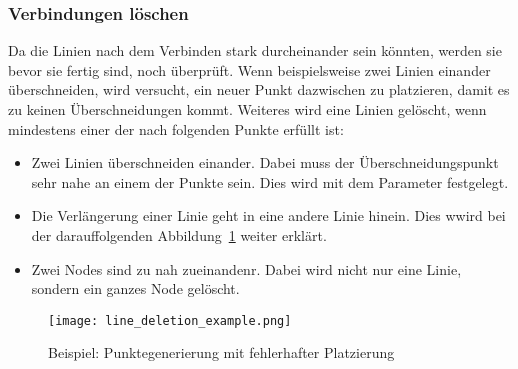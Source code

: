 \subsubsection{Verbindungen löschen}\label{subsubsec:verbindungen-loeschen}
Da die Linien nach dem Verbinden stark durcheinander sein könnten, werden sie bevor sie fertig sind, noch überprüft.
Wenn beispielsweise zwei Linien einander überschneiden, wird versucht, ein neuer Punkt dazwischen zu platzieren, damit es zu keinen Überschneidungen kommt.
Weiteres wird eine Linien gelöscht, wenn mindestens einer der nach folgenden Punkte erfüllt ist:
\begin{itemize}
    \item Zwei Linien überschneiden einander.
    Dabei muss der Überschneidungspunkt sehr nahe an einem der Punkte sein.
    Dies wird mit dem Parameter  festgelegt.
    \item Die Verlängerung einer Linie geht in eine andere Linie hinein.
    Dies wwird bei der darauffolgenden Abbildung~\ref{fig:line-deletion} weiter erklärt.
    \item Zwei Nodes sind zu nah zueinandenr.
    Dabei wird nicht nur eine Linie, sondern ein ganzes Node gelöscht.
\end{itemize}


\begin{figure}[H]
    \centering
    \texttt{[image: line\_deletion\_example.png]}
    \caption{Beispiel: Punktegenerierung mit fehlerhafter Platzierung}\label{fig:line-deletion}
\end{figure}